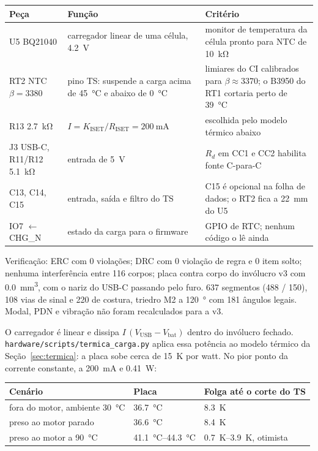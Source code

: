\documentclass[10pt,a4paper,landscape]{article}
\newcommand{\arq}[1]{\texttt{#1}}
\begin{document}
\begin{table}[H]\footnotesize
\begin{tabularx}{\textwidth}{@{}Y{0.7} Y{1.1} Y{1.2}@{}}
\toprule
\textbf{Peça} & \textbf{Função} & \textbf{Critério} \\
\midrule
U5 BQ21040 & carregador linear de uma célula, \SI{4.2}{\volt} & monitor de temperatura da célula pronto para NTC de \SI{10}{\kilo\ohm} \\
RT2 NTC $\beta=3380$ & pino TS: suspende a carga acima de \SI{45}{\celsius} e abaixo de \SI{0}{\celsius} & limiares do CI calibrados para $\beta\approx3370$; o B3950 do RT1 cortaria perto de \SI{39}{\celsius} \\
R13 \SI{2.7}{\kilo\ohm} & $I = K_\text{ISET}/R_\text{ISET} = \SI{200}{\milli\ampere}$ & escolhida pelo modelo térmico abaixo \\
J3 USB-C, R11/R12 \SI{5.1}{\kilo\ohm} & entrada de \SI{5}{\volt} & $R_d$ em CC1 e CC2 habilita fonte C-para-C \\
C13, C14, C15 & entrada, saída e filtro do TS & C15 é opcional na folha de dados; o RT2 fica a \SI{22}{\milli\meter} do U5 \\
IO7 $\leftarrow$ CHG\_N & estado da carga para o firmware & GPIO de RTC; nenhum código o lê ainda \\
\bottomrule
\end{tabularx}
\end{table}

Verificação: ERC com 0 violações; DRC com 0 violação de regra e 0 item solto; nenhuma interferência entre 116 corpos; placa contra corpo do invólucro v3 com \SI{0.0}{\milli\meter\cubed}, com o nariz do USB-C passando pelo furo. 637 segmentos (488 / 150), 108 vias de sinal e 220 de costura, triedro M2 a \SI{120}{\degree} com 181 ângulos legais. Modal, PDN e vibração não foram recalculados para a v3.

O carregador é linear e dissipa $I\,(V_\text{USB}-V_\text{bat})$ dentro do invólucro fechado. \arq{hardware/scripts/termica\_carga.py} aplica essa potência ao modelo térmico da Seção~\ref{sec:termica}: a placa sobe cerca de \SI{15}{\kelvin} por watt. No pior ponto da corrente constante, a \SI{200}{\milli\ampere} e \SI{0.41}{\watt}:

\begin{table}[H]\footnotesize
\begin{tabularx}{\textwidth}{@{}Y{1.2} Y{0.9} Y{0.9}@{}}
\toprule
\textbf{Cenário} & \textbf{Placa} & \textbf{Folga até o corte do TS} \\
\midrule
fora do motor, ambiente \SI{30}{\celsius} & \SI{36.7}{\celsius} & \SI{8.3}{\kelvin} \\
preso ao motor parado & \SI{36.6}{\celsius} & \SI{8.4}{\kelvin} \\
preso ao motor a \SI{90}{\celsius} & \SIrange{41.1}{44.3}{\celsius} & \SIrange{0.7}{3.9}{\kelvin}, otimista \\
\bottomrule
\end{tabularx}
\end{table}
\end{document}
